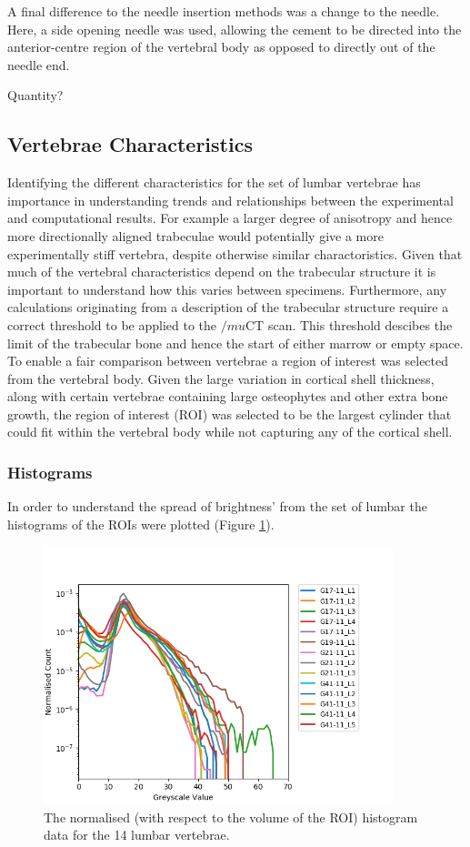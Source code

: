 A final difference to the needle insertion methods was a change to the needle.
Here, a side opening needle was used, allowing the cement to be directed into the anterior-centre region of the vertebral body as opposed to directly out of the needle end.

Quantity?

\subsection{Vertebrae Characteristics}

Identifying the different characteristics for the set of lumbar vertebrae has
importance in understanding trends and relationships between the experimental and
computational results.
For example a larger degree of anisotropy and hence more directionally aligned
trabeculae would potentially give a more experimentally stiff vertebra, despite
otherwise similar charactoristics.
Given that much of the vertebral characteristics depend on the trabecular
structure it is important to understand how this varies between specimens.
Furthermore, any calculations originating from a description of the trabecular
structure require a correct threshold to be applied to the $/mu$CT scan.
This threshold descibes the limit of the trabecular bone and hence the start of
either marrow or empty space.
To enable a fair comparison between vertebrae a region of interest was selected
from the vertebral body.
Given the large variation in cortical shell thickness, along with certain
vertebrae containing large osteophytes and other extra bone growth, the region of
interest (ROI) was selected to be the largest cylinder that could fit within the
vertebral body while not capturing any of the cortical shell.

\subsubsection{Histograms}

In order to understand the spread of brightness' from the set of lumbar the
histograms of the ROIs were plotted (Figure \ref{fig:normalisedhistogram}).

\begin{figure}[ht]
\centering
\includegraphics[width=4in]{Chapters/Chapter_HT_images/Normalised_Histogram.png}
\caption{The normalised (with respect to the volume of the ROI) histogram data
  for the 14 lumbar vertebrae.}
\label{fig:normalisedhistogram}
\end{figure}

